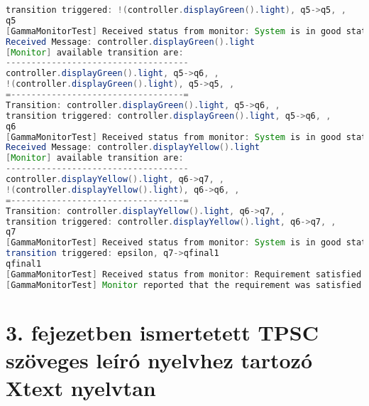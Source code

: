 \begin{lstlisting}[language=java, caption={\textit{Gamma} monitor kimenet rendőrségi példa.},captionpos=b,label=gamma_monitor_output2]
transition triggered: !(controller.displayGreen().light), q5->q5, ,
q5
[GammaMonitorTest] Received status from monitor: System is in good state.
Received Message: controller.displayGreen().light
[Monitor] available transition are:
------------------------------------
controller.displayGreen().light, q5->q6, ,
!(controller.displayGreen().light), q5->q5, ,
=----------------------------------=
Transition: controller.displayGreen().light, q5->q6, ,
transition triggered: controller.displayGreen().light, q5->q6, ,
q6
[GammaMonitorTest] Received status from monitor: System is in good state.
Received Message: controller.displayYellow().light
[Monitor] available transition are:
------------------------------------
controller.displayYellow().light, q6->q7, ,
!(controller.displayYellow().light), q6->q6, ,
=----------------------------------=
Transition: controller.displayYellow().light, q6->q7, ,
transition triggered: controller.displayYellow().light, q6->q7, ,
q7
[GammaMonitorTest] Received status from monitor: System is in good state.
transition triggered: epsilon, q7->qfinal1
qfinal1
[GammaMonitorTest] Received status from monitor: Requirement satisfied
[GammaMonitorTest] Monitor reported that the requirement was satisfied
\end{lstlisting}

\clearpage\section{3. fejezetben ismertetett TPSC szöveges leíró nyelvhez tartozó Xtext nyelvtan}

